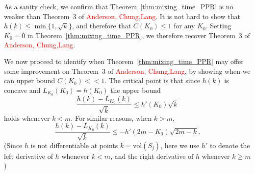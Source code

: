 \documentclass[11pt,twoside]{article}
\newcommand{\vol}{\mathrm{vol}}
\newcommand{\1}{\mathbf{1}}
\begin{document}
As a sanity check, we confirm that Theorem~\ref{thm:mixing_time_PPR} is no weaker than Theorem~3 of \textcolor{red}{Anderson, Chung,Lang}. It is not hard to show that $h(k) \leq \min\{1,\sqrt{k}\}$, and therefore that $C(K_0) \leq 1$ for any $K_0$. Setting $K_0 = 0$ in Theorem~\ref{thm:mixing_time_PPR}, we therefore recover Theorem~3 of \textcolor{red}{Anderson, Chung,Lang}.

We now proceed to identify when Theorem~\ref{thm:mixing_time_PPR} may offer some improvement on Theorem~3 of \textcolor{red}{Anderson, Chung,Lang}, by showing when we can upper bound $C(K_0) << 1$. The critical point is that since $h(k)$ is concave and $L_{K_0}(K_0) = h(K_0)$ the upper bound
\begin{equation*}
\frac{h(k) - L_{K_0}(k)}{\sqrt{\overline{k}}} \leq h'(K_0) \sqrt{k}
\end{equation*}
holds whenever $k < m$. For similar reasons, when $k > m$, 
\begin{equation*}
\frac{h(k) - L_{K_0}(k)}{\sqrt{\overline{k}}} \leq -h'(2m - K_0) \sqrt{2m - k}.
\end{equation*} 
(Since $h$ is not differentiable at points $k = \vol(S_j)$, here we use $h'$ to denote the left derivative of $h$ whenever $k < m$, and the right derivative of $h$ whenever $k \geq m$)  
\end{document}
